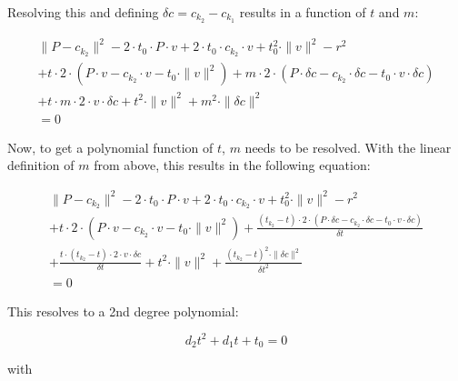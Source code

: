 Resolving this and defining \(\delta c = c_{k_2} - c_{k_1}\) results in a function of \(t\) and \(m\):

\begin{equation}\label{SphereBeforeM}
    \begin{split}
        \|P - c_{k_2}\|^2
        - 2 \cdot t_0 \cdot P \cdot v
        + 2 \cdot t_0 \cdot c_{k_2} \cdot v
        + t_0^2 \cdot \|v\|^2
        - r^2
        \\
        + t \cdot 2 \cdot (P \cdot v - c_{k_2} \cdot v - t_0 \cdot \|v\|^2)
        + m \cdot 2 \cdot (P \cdot \delta c - c_{k_2} \cdot \delta c - t_0 \cdot v \cdot \delta c)
        \\
        + t \cdot m \cdot 2 \cdot v \cdot \delta c
        + t^2 \cdot \|v\|^2
        + m^2 \cdot \|\delta c\|^2
        \\
        = 0
    \end{split}
\end{equation}

Now, to get a polynomial function of \(t\), \(m\) needs to be resolved.
With the linear definition of \(m\) from above, this results in the following equation:

\begin{equation*}
    \begin{split}
        \|P - c_{k_2}\|^2
        - 2 \cdot t_0 \cdot P \cdot v
        + 2 \cdot t_0 \cdot c_{k_2} \cdot v
        + t_0^2 \cdot \|v\|^2
        - r^2
        \\
        + t \cdot 2 \cdot (P \cdot v - c_{k_2} \cdot v - t_0 \cdot \|v\|^2)
        + \frac{(t_{k_2} - t) \cdot
            2 \cdot (P \cdot \delta c - c_{k_2} \cdot \delta c - t_0 \cdot v \cdot \delta c)
        }{\delta t}
        \\
        + \frac{t \cdot (t_{k_2} - t) \cdot 2 \cdot v \cdot \delta c}{\delta t}
        + t^2 \cdot \|v\|^2
        + \frac{(t_{k_2} - t)^2 \cdot \|\delta c\|^2}{\delta t^2}
        \\
        = 0
    \end{split}
\end{equation*}

This resolves to a 2nd degree polynomial:

\begin{equation}
    d_2t^2 + d_1t + t_0 = 0
\end{equation}

with

